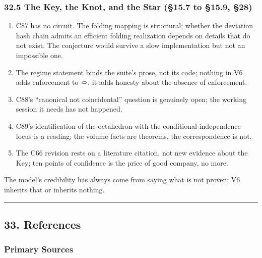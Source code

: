 \documentclass[
  11pt,
]{article}
\providecommand{\tightlist}{%
  \setlength{\itemsep}{0pt}\setlength{\parskip}{0pt}}
\begin{document}
\subsubsection{32.5 The Key, the Knot, and the Star (§15.7 to §15.9,
§28)}\label{the-key-the-knot-and-the-star-15.7-to-15.9-28}

\begin{enumerate}
\def\labelenumi{\arabic{enumi}.}
\tightlist
\item
  C87 has no circuit. The folding mapping is structural; whether the
  deviation hash chain admits an efficient folding realization depends
  on details that do not exist. The conjecture would survive a slow
  implementation but not an impossible one.
\item
  The regime statement binds the suite's prose, not its code; nothing in
  V6 adds enforcement to 🪢, it adds honesty about the absence of
  enforcement.
\item
  C88's ``canonical not coincidental'' question is genuinely open; the
  working session it needs has not happened.
\item
  C89's identification of the octahedron with the
  conditional-independence locus is a reading; the volume facts are
  theorems, the correspondence is not.
\item
  The C66 revision rests on a literature citation, not new evidence
  about the Key; ten points of confidence is the price of good company,
  no more.
\end{enumerate}

The model's credibility has always come from saying what is not proven;
V6 inherits that or inherits nothing.

\begin{center}\rule{0.5\linewidth}{0.5pt}\end{center}

\subsection{33. References}\label{references}

\subsubsection{Primary Sources}\label{primary-sources}
\end{document}
